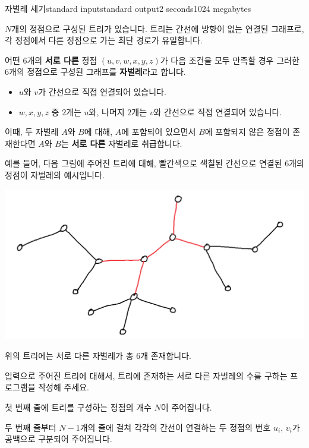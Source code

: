 \begin{problem}{자벌레 세기}{standard input}{standard output}{2 seconds}{1024 megabytes}

$N$개의 정점으로 구성된 트리가 있습니다. 트리는 간선에 방향이 없는 연결된 그래프로, 각 정점에서 다른 정점으로 가는 최단 경로가 유일합니다.

어떤 $6$개의 \textbf{서로 다른} 정점 $(u,v,w,x,y,z)$가 다음 조건을 모두 만족할 경우 그러한 $6$개의 정점으로 구성된 그래프를 \textbf{자벌레}라고 합니다.

\begin{itemize}
\item $u$와 $v$가 간선으로 직접 연결되어 있습니다.
\item $w,x,y,z$ 중 $2$개는 $u$와, 나머지 $2$개는 $v$와 간선으로 직접 연결되어 있습니다.
\end{itemize}

이때, 두 자벌레 $A$와 $B$에 대해, $A$에 포함되어 있으면서 $B$에 포함되지 않은 정점이 존재한다면 $A$와 $B$는 \textbf{서로 다른} 자벌레로 취급합니다.

예를 들어, 다음 그림에 주어진 트리에 대해, 빨간색으로 색칠된 간선으로 연결된 $6$개의 정점이 자벌레의 예시입니다.

\begin{center}
  \includegraphics[scale=0.5]{stickbug.png}
\end{center}

위의 트리에는 서로 다른 자벌레가 총 $6$개 존재합니다.

입력으로 주어진 트리에 대해서, 트리에 존재하는 서로 다른 자벌레의 수를 구하는 프로그램을 작성해 주세요.

\InputFile
첫 번째 줄에 트리를 구성하는 정점의 개수 $N$이 주어집니다.

두 번째 줄부터 $N-1$개의 줄에 걸쳐 각각의 간선이 연결하는 두 정점의 번호 $u_i$, $v_i$가 공백으로 구분되어 주어집니다.




\end{problem}

